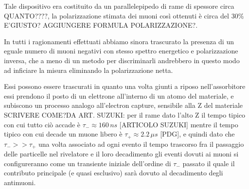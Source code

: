 Tale dispositivo era costituito da un parallelepipedo di rame di spessore circa QUANTO????, la polarizzazione stimata dei muoni così ottenuti è circa del 30\% E'GIUSTO? AGGIUNGERE FORMULA POLARIZZAZIONE?.\par
In tutti i ragionamenti effettuati abbiamo sinora trascurato la presenza di un eguale numero di muoni negativi con stesso spettro energetico e polarizzazione inversa, che a meno di un metodo per discriminarli andrebbero in questo modo ad inficiare la misura eliminando la polarizzazione netta. \par
Essi possono essere trascurati in quanto una volta giunti a riposo nell'assorbitore essi prendono il posto di un elettrone all'interno di un atomo del materiale, e subiscono un  processo analogo all'electron capture, sensibile alla Z del materiale SCRIVERE COME?DA ART. SUZUKI: per il rame dato l'alto Z il tempo tipico con cui tutto ciò accade è $\tau_-\approx 160 \, ns$ [ARTICOLO SUZUKI] mentre il tempo tipico con cui decade un muone libero è $\tau_+\approx 2.2 \, \mu s$ [PDG], e quindi dato che $\tau_->>\tau_+$ una volta associato ad ogni evento il tempo trascorso fra il passaggio delle particelle nel rivelatore e il loro decadimento gli eventi dovuti ai muoni si configureranno come un transiente iniziale dell'ordine di $\tau_-$ passato il quale il contributo principale (e quasi esclusivo) sarà dovuto al decadimento degli antimuoni. \par

